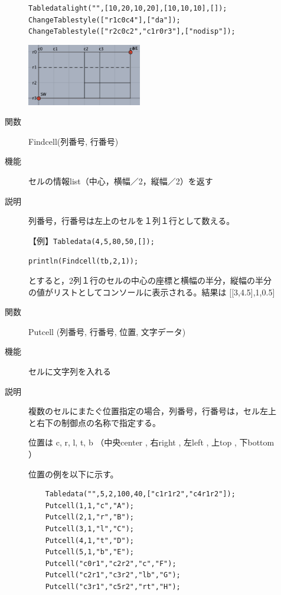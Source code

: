 \documentclass[papersize,a4paper,12pt,uplatex]{jsarticle}
\begin{document}
\begin{description}
\begin{description}
\verb|Tabledatalight("",[10,20,10,20],[10,10,10],[]);|\\
\verb|ChangeTablestyle(["r1c0c4"],["da"]);|\\
\verb|ChangeTablestyle(["r2c0c2","c1r0r3"],["nodisp"]);|

\vspace{\baselineskip}
\hspace{20mm}\includegraphics[bb=0.00 0.00 324.00 174.00,width=50mm]{Fig/changetable.pdf} 
    
\vspace{\baselineskip}
\hypertarget{findcell}{}
\item[関数]  Findcell(列番号, 行番号)
\item[機能]  セルの情報list（中心，横幅／2，縦幅／2）を返す
\item[説明]  列番号，行番号は左上のセルを１列１行として数える。

\vspace{\baselineskip}
【例】\verb|Tabledata(4,5,80,50,[]);|

    \verb|println(Findcell(tb,2,1));|
    
    とすると，2列１行のセルの中心の座標と横幅の半分，縦幅の半分の値がリストとしてコンソールに表示される。結果は [[3,4.5],1,0.5]

\vspace{\baselineskip}
\hypertarget{putcell}{}
\item[関数]  Putcell (列番号, 行番号, 位置, 文字データ)
\item[機能]  セルに文字列を入れる
\item[説明]  複数のセルにまたぐ位置指定の場合，列番号，行番号は，セル左上と右下の制御点の名称で指定する。

位置は  c, r, l, t, b （中央center , 右right , 左left , 上top , 下bottom   ）
  
位置の例を以下に示す。
\begin{verbatim}
    Tabledata("",5,2,100,40,["c1r1r2","c4r1r2"]);
    Putcell(1,1,"c","A");
    Putcell(2,1,"r","B");
    Putcell(3,1,"l","C");
    Putcell(4,1,"t","D");
    Putcell(5,1,"b","E");
    Putcell("c0r1","c2r2","c","F");
    Putcell("c2r1","c3r2","lb","G");
    Putcell("c3r1","c5r2","rt","H");
\end{verbatim}
\vspace{\baselineskip}
      \begin{center}  \end{center}


\end{description}
\end{description}
\end{document}
